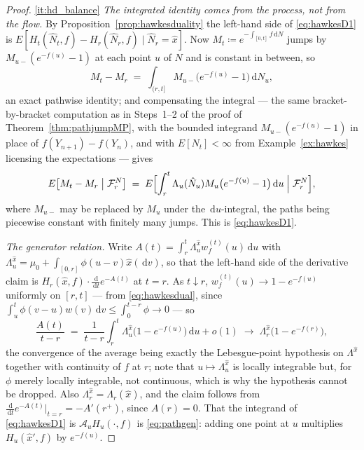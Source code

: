 \documentclass[11pt,a4paper]{article}
\theoremstyle{plain}
\theoremstyle{definition}
\theoremstyle{remark}
\newcommand{\Filt}{\mathcal{F}}
\newcommand{\dif}{\,\mathrm{d}}
\begin{document}
\begin{proof}
  \ref{it:hd_balance}  \emph{The integrated identity comes from the process, not
  from the flow.}  By Proposition~\ref{prop:hawkesduality} the left-hand side of
  \eqref{eq:hawkesD1} is
  $E[H_t(\hat{N}_t,f) - H_r(\hat{N}_r,f) \mid \hat{N}_r = \hat{x}]$.  Now
  $M_t \coloneqq e^{-\int_{[0,t]}f\dif N}$ jumps by
  $M_{u-}(e^{-f(u)}-1)$ at each point $u$ of $N$ and is constant in between, so
  \[
    M_t - M_r \;=\; \int_{(r,t]} M_{u-}\bigl(e^{-f(u)}-1\bigr) \dif N_u ,
  \]
  an exact pathwise identity; and compensating the integral --- the same
  bracket-by-bracket computation as in Steps~1--2 of the proof of
  Theorem~\ref{thm:pathjumpMP}, with the bounded integrand
  $M_{u-}(e^{-f(u)}-1)$ in place of $f(Y_{n+1})-f(Y_n)$, and with
  $E[N_t] < \infty$ from Example~\ref{ex:hawkes} licensing the expectations ---
  gives
  \[
    E\bigl[ M_t - M_r \bigm| \Filt^N_r \bigr]
      \;=\; E\Bigl[ \int_r^t \Lambda_u(\hat{N}_u) M_{u}\bigl(e^{-f(u)}-1\bigr)
        \dif u \Bigm| \Filt^N_r \Bigr] ,
  \]
  where $M_{u-}$ may be replaced by $M_u$ under the $\dif u$-integral, the paths
  being piecewise constant with finitely many jumps.  This is
  \eqref{eq:hawkesD1}.

  \emph{The generator relation.}  Write
  $A(t) = \int_r^t \Lambda^{\hat{x}}_u w^{(t)}_f(u)\dif u$
  with $\Lambda^{\hat{x}}_u = \mu_0 + \int_{[0,r]}\phi(u-v)\hat{x}(\dif v)$, so
  that the left-hand side of the derivative claim is
  $H_r(\hat x,f) \cdot \frac{\dif}{\dif t}e^{-A(t)}$ at
  $t = r$.  As $t \downarrow r$, $w^{(t)}_f(u) \to 1 - e^{-f(u)}$ uniformly on
  $[r,t]$ --- from \eqref{eq:hawkesdual}, since
  $\int_u^t \phi(v-u)w(v)\dif v \leq \int_0^{t-r}\phi \to 0$ --- so
  \[
    \frac{A(t)}{t-r} \;=\; \frac{1}{t-r}\int_r^t \Lambda^{\hat{x}}_u
      \bigl(1 - e^{-f(u)}\bigr) \dif u + o(1)
    \;\longrightarrow\; \Lambda^{\hat{x}}_r \bigl(1 - e^{-f(r)}\bigr) ,
  \]
  the convergence of the average being exactly the Lebesgue-point hypothesis on
  $\Lambda^{\hat{x}}$ together with continuity of $f$ at $r$;
  note that $u \mapsto \Lambda^{\hat{x}}_u$ is locally integrable but, for
  $\phi$ merely locally integrable, not continuous, which is why the hypothesis
  cannot be dropped.  Also
  $\Lambda^{\hat{x}}_r = \Lambda_r(\hat{x})$, and the claim follows from
  $\frac{\dif}{\dif t}e^{-A(t)}\vert_{t=r} = -A'(r^+)$, since $A(r) = 0$.  That
  the integrand of \eqref{eq:hawkesD1} is $\mathcal{A}_uH_u(\cdot,f)$ is
  \eqref{eq:pathgen}: adding one point at $u$ multiplies
  $H_u(\hat{x}',f)$ by $e^{-f(u)}$.


\end{proof}
\end{document}
